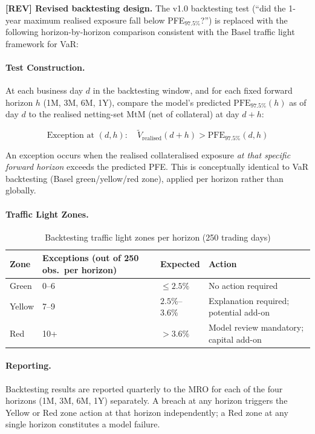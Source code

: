 \documentclass[11pt,a4paper]{article}
\begin{document}
\textbf{[REV] Revised backtesting design.} The v1.0 backtesting test
(``did the 1-year maximum realised exposure fall below PFE$_{97.5\%}$?'') is
replaced with the following horizon-by-horizon comparison consistent with
the Basel traffic light framework for VaR:

\paragraph{Test Construction.}
At each business day $d$ in the backtesting window, and for each fixed
forward horizon $h$ (1M, 3M, 6M, 1Y), compare the model's predicted
$\text{PFE}_{97.5\%}(h)$ as of day $d$ to the realised netting-set MtM
(net of collateral) at day $d + h$:

\begin{equation}
  \text{Exception at }(d, h):
    \quad \tilde{V}_{\text{realised}}(d+h) > \text{PFE}_{97.5\%}(d, h)
  \label{eq:backtest_exception}
\end{equation}

An exception occurs when the realised collateralised exposure \emph{at that
specific forward horizon} exceeds the predicted PFE. This is conceptually
identical to VaR backtesting (Basel green/yellow/red zone), applied per
horizon rather than globally.

\paragraph{Traffic Light Zones.}

\begin{table}[h!]
\centering
\begin{tabular}{@{}llll@{}}
\toprule
\textbf{Zone} & \textbf{Exceptions (out of 250 obs.\ per horizon)} & \textbf{Expected} & \textbf{Action} \\
\midrule
Green  & 0--6   & $\leq 2.5\%$  & No action required \\
Yellow & 7--9   & $2.5\%$--$3.6\%$ & Explanation required; potential add-on \\
Red    & 10+    & $>3.6\%$      & Model review mandatory; capital add-on \\
\bottomrule
\end{tabular}
\caption{Backtesting traffic light zones per horizon (250 trading days)}
\end{table}

\paragraph{Reporting.}
Backtesting results are reported quarterly to the MRO for each of the four
horizons (1M, 3M, 6M, 1Y) separately. A breach at any horizon triggers the
Yellow or Red zone action at that horizon independently; a Red zone at any
single horizon constitutes a model failure.
\end{document}
